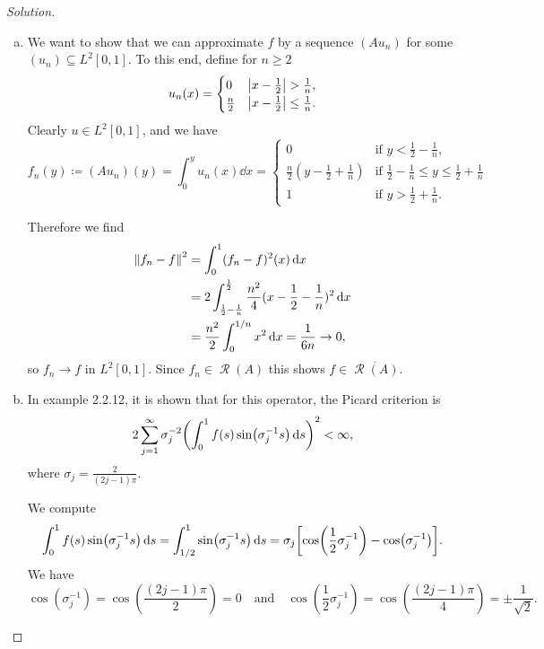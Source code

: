 \documentclass{article}
\theoremstyle{plain}
\theoremstyle{remark}
\newenvironment{solution}{\begin{proof}[Solution]\renewcommand\qedsymbol{}}{\end{proof}}
\newcommand{\Cal}{\mathcal}
\newcommand\ceq\coloneqq %
\newcommand\clos\overline
\DeclareMathOperator\Ran{\Cal R}
\begin{document}
\begin{solution}
	\begin{enumerate}[(a)]
		\item We want to show that we can approximate $f$ by a sequence $(Au_n)$ for some $(u_n) \subseteq L^2[0,1]$. To this end, define for $n \geq 2$
		\[
		u_n(x) =
		\begin{cases}
			0 &\abs{x - \frac12} > \frac1n, \\
			\frac n2 &\abs{x - \frac12} \leq \frac1n. 
		\end{cases}
		\]
		Clearly $u \in L^2[0, 1]$, and we have
		\[
		f_n(y) \ceq (Au_n)(y) = \int_0^y u_n(x) \dd{x} = \begin{cases}
			0 &\text{if $y < \frac12 - \frac1n$,}\\
			\frac n2(y - \frac12 + \frac1n) &\text{if $\frac12 - \frac1n \leq y \leq \frac12 + \frac1n$} \\
			1 &\text{if $y > \frac12 + \frac1n$}. 
		\end{cases}
		\]
		
		Therefore we find
		\begin{align*}
			\norm{f_n - f}^2 &= \int_0^1 (f_n - f)^2(x) \dd{x} \\
			&= 2 \int_{\frac12 - \frac1n}^{\frac12} \frac{n^2}{4} (x - \frac12 - \frac1n)^2 \dd{x} \\
			&= \frac{n^2}{2} \int_0^{1/n}  x^2 \dd{x} = \frac{1}{6n} \to 0, 
		\end{align*}
	so $f_n \to f$ in $L^2[0, 1]$. Since $f_n \in \Ran(A)$ this shows $f \in \clos{\Ran(A)}$. 
	

	\item 	In example 2.2.12, it is shown that for this operator, the Picard criterion is
	\begin{equation} \label{eq:picard}
	2\sum_{j=1}^\infty  \sigma_j^{-2} \qty(\int_0^1 f(s) \sin(\sigma_j^{-1} s) \dd{s})^2 < \infty,
	\end{equation}
	where $\sigma_j = \frac2{(2j - 1)\pi}$.
	
	We compute
	\[
	\int_0^1 f(s) \sin(\sigma_j^{-1} s) \dd{s} = \int_{1/2}^1 \sin(\sigma_j^{-1} s) \dd{s} = \sigma_j \qty[ \cos(\frac12 \sigma_j^{-1}) - \cos(\sigma_j^{-1})]. 
	\]
	We have
	\[
	\cos(\sigma_j^{-1}) = \cos(\frac{(2j - 1)\pi}{2}) = 0 \quad\text{and}\quad \cos(\frac12\sigma_j^{-1}) = \cos(\frac{(2j-1)\pi}{4}) = \pm\frac1{\sqrt2 }. 
	\]
	

\end{enumerate}
\end{solution}
\end{document}
